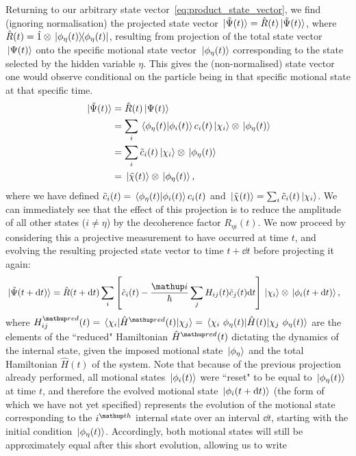 Returning to our arbitrary state vector~\eqref{eq:product_state_vector}, we find (ignoring normalisation) the projected state vector $\ket{\tilde \Psi(t)} = \hat R(t)\ket{\tilde \Psi(t)}$, where $\hat R(t) = \hat 1 \otimes \ketbra{\phi_\eta(t)}{\phi_\eta(t)}$, resulting from projection of the total state vector $\ket{\Psi(t)}$ onto the specific motional state vector $\ket{\phi_\eta(t)}$ corresponding to the state selected by the hidden variable $\eta$. This gives the (non-normalised) state vector one would observe conditional on the particle being in that specific motional state at that specific time.
\begin{align}
\ket{\tilde \Psi(t)} &= \hat R(t) \ket{\Psi(t)}\\
&= \sum_i\braket{\phi_\eta(t)}{\phi_i(t)}c_i(t)\ket{\chi_i}\otimes\ket{\phi_\eta(t)}\\
&= \sum_i\tilde c_i(t)\ket{\chi_i}\otimes\ket{\phi_\eta(t)}\\
&= \ket{\tilde \chi(t)}\otimes\ket{\phi_\eta(t)},
\end{align}
where we have defined $\tilde c_i(t) = \braket{\phi_\eta(t)}{\phi_i(t)}c_i(t)$ and $\ket{\tilde \chi(t)} = \sum_i \tilde c_i(t)\ket{\chi_i}$. We can immediately see that the effect of this projection is to reduce the amplitude of all other states ($i\neq\eta$) by the decoherence factor $R_{\eta i}(t)$. We now proceed by considering this a projective measurement to have occurred at time $t$, and evolving the resulting projected state vector to time $t+\dd t$ before projecting it again:
\begin{align}\label{eq:second_proj}
\ket{\tilde \Psi(t + \dd t)} &= 
\hat R(t + \dd t)
\sum_i
\left[\tilde c_i(t) - \frac\ii\hbar\sum_j H_{ij}(t)\tilde c_j(t)\dd t\right]
\ket{\chi_i}\otimes\ket{\phi_i(t + \dd t)},
\end{align}
where $H^\up{red}_{ij}(t) = \matrixel{\chi_i}{\hat H^\up{red}(t)}{\chi_j} = \matrixel{\chi_i\ \phi_\eta(t)}{\hat H(t)}{\chi_j\ \phi_\eta(t)}$ are the elements of the ``reduced" Hamiltonian $\hat H^\up{red}(t) $ dictating the dynamics of the internal state, given the imposed motional state $\ket{\phi_\eta}$ and the total Hamiltonian $\hat H(t)$ of the system. Note that because of the previous projection already performed, all motional states $\ket{\phi_i(t)}$ were ``reset" to be equal to $\ket{\phi_\eta(t)}$ at time $t$, and therefore the evolved motional state $\ket{\phi_i(t + \dd t)}$ (the form of which we have not yet specified) represents the evolution of the motional state corresponding to the $i^\up{th}$ internal state over an interval $\dd t$, starting with the initial condition $\ket{\phi_\eta(t)}$. Accordingly, both motional states will still be approximately equal after this short evolution, allowing us to write
